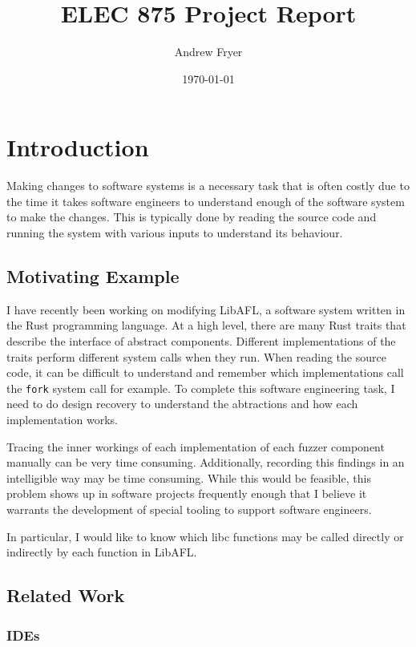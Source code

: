 \documentclass[11pt]{article}
\title{ELEC 875 Project Report}
\author{Andrew Fryer}
\date{\today}
\begin{document}
\maketitle

\section{Introduction}

Making changes to software systems is a necessary task that is often costly due to the time it takes software engineers to understand enough of the software system to make the changes.
This is typically done by reading the source code and running the system with various inputs to understand its behaviour.

\subsection{Motivating Example}

I have recently been working on modifying LibAFL, a software system written in the Rust programming language.
At a high level, there are many Rust traits that describe the interface of abstract components.
Different implementations of the traits perform different system calls when they run.
When reading the source code, it can be difficult to understand and remember which implementations call the \lstinline{fork} system call for example.
To complete this software engineering task, I need to do design recovery to understand the abtractions and how each implementation works.

Tracing the inner workings of each implementation of each fuzzer component manually can be very time consuming.
Additionally, recording this findings in an intelligible way may be time consuming.
While this would be feasible, this problem shows up in software projects frequently enough that I believe it warrants the development of special tooling to support software engineers.

In particular, I would like to know which libc functions may be called directly or indirectly by each function in LibAFL.

\subsection{Related Work}

\subsubsection{IDEs}
\end{document}
